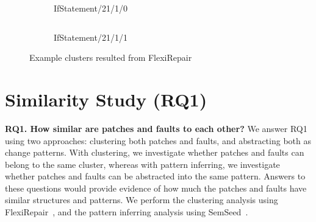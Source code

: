 \documentclass[conference]{IEEEtran}
\begin{document}






\begin{figure}[!ht]
    \centering
    \begin{subfigure}{\linewidth}
        \centering\inputminted[escapeinside=||]{diff}{figures/diff/spinfer_example_a.diff}
        \caption{IfStatement/21/1/0}
        \label{fig:spinfer_example1}
    \end{subfigure}

    \begin{subfigure}{\linewidth}
        \centering\inputminted[escapeinside=||]{diff}{figures/diff/spinfer_example_b.diff}
        \caption{IfStatement/21/1/1}
        \label{fig:spinfer_example2}
    \end{subfigure}
    
    \caption{Example clusters resulted from FlexiRepair}
    \label{fig:spinfer_example}
\end{figure}


\section{Similarity Study (RQ1)}
\label{sec:RQ1}

\textbf{RQ1. How similar are patches and faults to each other?}
We answer RQ1 using two approaches: clustering both patches and faults, and
abstracting both as change patterns. With clustering, we investigate whether
patches and faults can belong to the same cluster, whereas with pattern
inferring, we investigate whether patches and faults can be abstracted into the
same pattern. Answers to these questions would provide evidence of how much the
patches and faults have similar structures and patterns. We perform the
clustering analysis using FlexiRepair~\cite{koyuncu2020flexirepair}, and the
pattern inferring analysis using SemSeed~\cite{patra2021semantic}.
\end{document}

